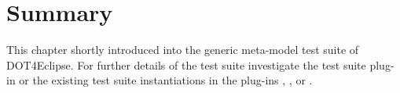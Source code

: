 \section{Summary}

This chapter shortly introduced into the generic meta-model test suite of \acl{DOT4Eclipse}. For further details of the test suite investigate the test suite plug-in  or the existing test suite instantiations in the plug-ins , , or .
